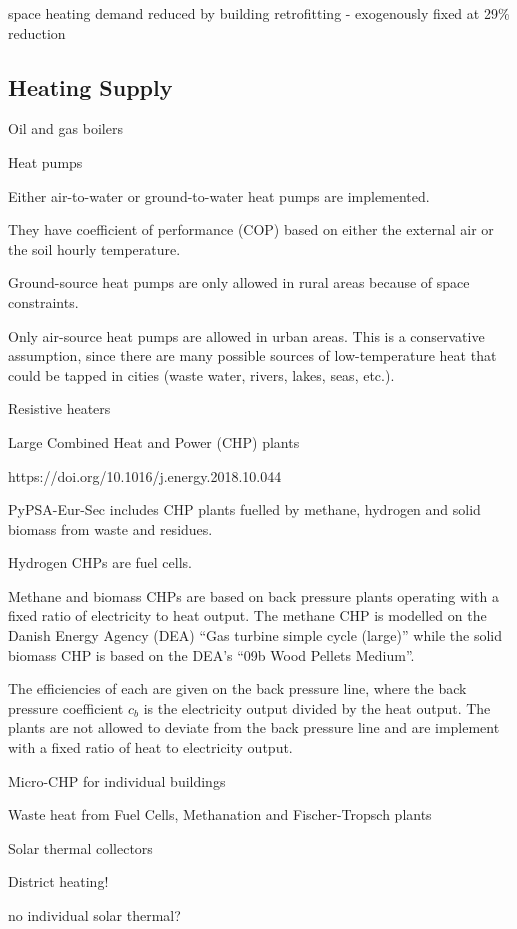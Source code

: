 space heating demand reduced by building retrofitting
- exogenously fixed at 29\% reduction

\subsection{Heating Supply}

Oil and gas boilers

Heat pumps

Either air-to-water or ground-to-water heat pumps are implemented.

They have coefficient of performance (COP) based on either the external air or the soil hourly temperature.

Ground-source heat pumps are only allowed in rural areas because of space constraints.

Only air-source heat pumps are allowed in urban areas. This is a conservative
assumption, since there are many possible sources of low-temperature heat that
could be tapped in cities (waste water, rivers, lakes, seas, etc.).

Resistive heaters

Large Combined Heat and Power (CHP) plants

https://doi.org/10.1016/j.energy.2018.10.044

PyPSA-Eur-Sec includes CHP plants fuelled by methane, hydrogen and solid biomass from waste and residues.

Hydrogen CHPs are fuel cells.

Methane and biomass CHPs are based on back pressure plants operating with a
fixed ratio of electricity to heat output. The methane CHP is modelled on the
Danish Energy Agency (DEA) “Gas turbine simple cycle (large)” while the solid
biomass CHP is based on the DEA’s “09b Wood Pellets Medium”.

The efficiencies of each are given on the back pressure line, where the back
pressure coefficient $c_b$ is the electricity output divided by the heat output.
The plants are not allowed to deviate from the back pressure line and are
implement with a fixed ratio of heat to electricity output.

Micro-CHP for individual buildings

Waste heat from Fuel Cells, Methanation and Fischer-Tropsch plants

Solar thermal collectors

District heating!

no individual solar thermal?

